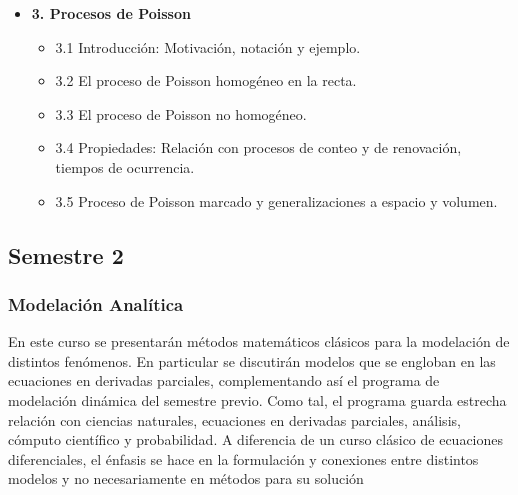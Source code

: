 \documentclass[10pt,a4paper]{article}
\begin{document}
\begin{itemize}
    \item \textbf{3. Procesos de Poisson}
    \begin{itemize}
        \item 3.1 Introducción: Motivación, notación y ejemplo.
        \item 3.2 El proceso de Poisson homogéneo en la recta.
        \item 3.3 El proceso de Poisson no homogéneo.
        \item 3.4 Propiedades: Relación con procesos de conteo y de renovación, tiempos de ocurrencia.
        \item 3.5 Proceso de Poisson marcado y generalizaciones a espacio y volumen.
    \end{itemize}
\end{itemize}

\newpage

\subsection{Semestre 2}
\subsubsection{Modelación Analítica}

En este curso se presentarán métodos matemáticos clásicos para la modelación de distintos fenómenos. En particular se discutirán modelos que se engloban en las ecuaciones en derivadas parciales, complementando así el programa de modelación dinámica del semestre previo. Como tal, el programa guarda estrecha relación con ciencias naturales, ecuaciones en derivadas parciales, análisis, cómputo científico y probabilidad. A diferencia de un curso clásico de ecuaciones diferenciales, el énfasis se hace en la formulación y conexiones entre distintos modelos y no necesariamente en métodos para su solución
\end{document}
